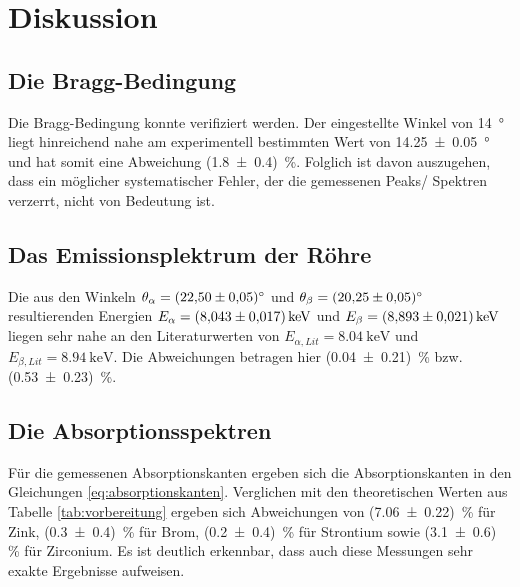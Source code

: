 \section{Diskussion}

\subsection{Die Bragg-Bedingung}
Die Bragg-Bedingung konnte verifiziert werden.
Der eingestellte Winkel von \qty[]{14}{\degree} liegt hinreichend nahe am experimentell bestimmten Wert von \qty{14.25+-0.05}{\degree}
und hat somit eine Abweichung (\num[]{1.8 +- 0.4}) \,\%.
Folglich ist davon auszugehen, dass ein möglicher systematischer Fehler, der die gemessenen Peaks/ Spektren verzerrt, nicht von Bedeutung ist.


\subsection{Das Emissionsplektrum der Röhre}
Die aus den Winkeln $\theta_\alpha = \qty{22.50 \pm 0.05}{\degree}$ und $\theta_\beta = \qty{20.25 \pm 0.05}{\degree}$
 resultierenden Energien $E_\alpha = \qty{8.043 \pm 0.017}{\kilo\eV}$ und $E_\beta  = \qty{8.893 \pm 0.021}{\kilo\eV}$
liegen sehr nahe an den Literaturwerten von $E_{\alpha,Lit} = \qty[]{8.04}{\kilo\electronvolt}$ und
$E_{\beta,Lit} = \qty[]{8.94}{\kilo\electronvolt}$.
Die Abweichungen betragen hier (\num[]{0.04 +- 0.21}) \,\% bzw. (\num[]{0.53 +- 0.23}) \,\%.


\subsection{Die Absorptionsspektren}
Für die gemessenen Absorptionskanten ergeben sich die Absorptionskanten in den Gleichungen \eqref{eq:absorptionskanten}.
Verglichen mit den theoretischen Werten aus Tabelle \ref{tab:vorbereitung} ergeben sich Abweichungen von (\num[]{7.06 +- 0.22}) \,\% für Zink,
(\num[]{0.3 +- 0.4}) \,\% für Brom, (\num[]{0.2 +- 0.4}) \,\% für Strontium sowie (\num[]{3.1 +- 0.6}) \,\% für Zirconium.
Es ist deutlich erkennbar, dass auch diese Messungen sehr exakte Ergebnisse aufweisen.


